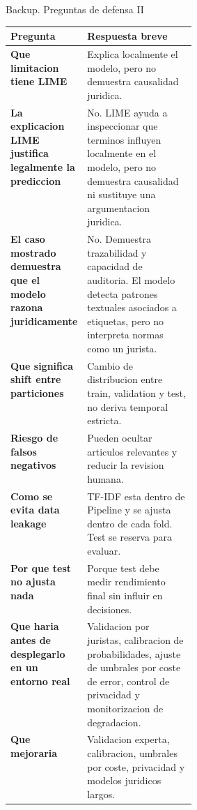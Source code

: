 \documentclass[aspectratio=169,10pt]{beamer}
\begin{document}
\begin{frame}{Backup. Preguntas de defensa II}
  \footnotesize
  \begin{tabularx}{\linewidth}{>{\bfseries}p{0.31\linewidth}X}
      \toprule
      Pregunta & Respuesta breve\\
      \midrule
      Que limitacion tiene LIME & Explica localmente el modelo, pero no demuestra causalidad juridica.\\
      La explicacion LIME justifica legalmente la prediccion & No. LIME ayuda a inspeccionar que terminos influyen localmente en el modelo, pero no demuestra causalidad ni sustituye una argumentacion juridica.\\
      El caso mostrado demuestra que el modelo razona juridicamente & No. Demuestra trazabilidad y capacidad de auditoria. El modelo detecta patrones textuales asociados a etiquetas, pero no interpreta normas como un jurista.\\
      Que significa shift entre particiones & Cambio de distribucion entre train, validation y test, no deriva temporal estricta.\\
      Riesgo de falsos negativos & Pueden ocultar articulos relevantes y reducir la revision humana.\\
      Como se evita data leakage & TF-IDF esta dentro de Pipeline y se ajusta dentro de cada fold. Test se reserva para evaluar.\\
      Por que test no ajusta nada & Porque test debe medir rendimiento final sin influir en decisiones.\\
      Que haria antes de desplegarlo en un entorno real & Validacion por juristas, calibracion de probabilidades, ajuste de umbrales por coste de error, control de privacidad y monitorizacion de degradacion.\\
      Que mejoraria & Validacion experta, calibracion, umbrales por coste, privacidad y modelos juridicos largos.\\
      \bottomrule
  \end{tabularx}
\end{frame}
\end{document}
